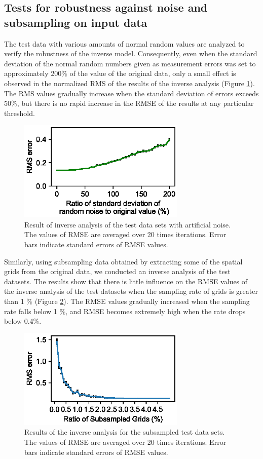 \subsection{Tests for robustness against noise and subsampling on input data}
The test data with various amounts of normal random values are analyzed to verify the robustness of the inverse model. Consequently, even when the standard deviation of the normal random numbers given as measurement errors was set to approximately 200\% of the value of the original data, only a small effect is observed in the normalized RMS of the results of the inverse analysis (Figure \ref{fig:test_noise}). The RMS values gradually increase when the standard deviation of errors exceeds 50\%, but there is no rapid increase in the RMSE of the results at any particular threshold.

\begin{figure}[t]
  \includegraphics[width=8cm]{fig10.eps}
  \caption{Result of inverse analysis of the test data sets with artificial noise. The values of RMSE are averaged over 20 times iterations. Error bars indicate standard errors of RMSE values.}
 \label{fig:test_noise}
\end{figure}


Similarly, using subsampling data obtained by extracting some of the spatial grids from the original data, we conducted an inverse analysis of the test datasets. The results show that there is little influence on the RMSE values of the inverse analysis of the test datasets when the sampling rate of grids is greater than 1 \% (Figure \ref{fig:test_subsampling}). The RMSE values gradually increased when the sampling rate falls below 1 \%, and RMSE becomes extremely high when the rate drops below 0.4\%.

\begin{figure}[t]
  \includegraphics[width=8cm]{fig11.eps}
  \caption{Results of the inverse analysis for the subsampled test data sets. The values of RMSE are averaged over 20 times iterations. Error bars indicate standard errors of RMSE values.}
 \label{fig:test_subsampling}
\end{figure}

